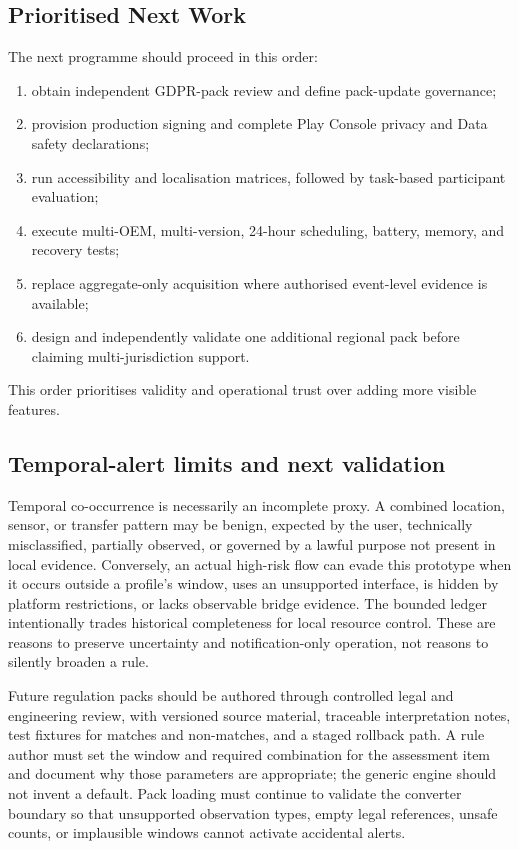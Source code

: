 \subsection{Prioritised Next Work}

The next programme should proceed in this order:

\begin{enumerate}
    \item obtain independent GDPR-pack review and define pack-update governance;
    \item provision production signing and complete Play Console privacy and Data safety declarations;
    \item run accessibility and localisation matrices, followed by task-based participant evaluation;
    \item execute multi-OEM, multi-version, 24-hour scheduling, battery, memory, and recovery tests;
    \item replace aggregate-only acquisition where authorised event-level evidence is available;
    \item design and independently validate one additional regional pack before claiming multi-jurisdiction support.
\end{enumerate}

This order prioritises validity and operational trust over adding more visible features.

\subsection{Temporal-alert limits and next validation}

Temporal co-occurrence is necessarily an incomplete proxy. A combined location, sensor, or transfer pattern may be benign, expected by the user, technically misclassified, partially observed, or governed by a lawful purpose not present in local evidence. Conversely, an actual high-risk flow can evade this prototype when it occurs outside a profile's window, uses an unsupported interface, is hidden by platform restrictions, or lacks observable bridge evidence. The bounded ledger intentionally trades historical completeness for local resource control. These are reasons to preserve uncertainty and notification-only operation, not reasons to silently broaden a rule.

Future regulation packs should be authored through controlled legal and engineering review, with versioned source material, traceable interpretation notes, test fixtures for matches and non-matches, and a staged rollback path. A rule author must set the window and required combination for the assessment item and document why those parameters are appropriate; the generic engine should not invent a default. Pack loading must continue to validate the converter boundary so that unsupported observation types, empty legal references, unsafe counts, or implausible windows cannot activate accidental alerts.

